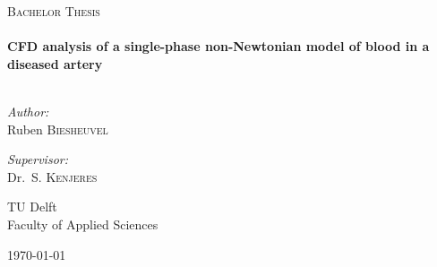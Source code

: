 \begin{titlepage}
\begin{center}



\textsc{\Large Bachelor Thesis}\\[0.5cm]

\HRule \\[0.4cm]
{ \huge \bfseries CFD analysis of a single-phase non-Newtonian model of blood in a diseased artery}\\[0.4cm]

\HRule \\[1.5cm]

\begin{minipage}{0.45\textwidth}
\begin{flushleft} \large
\emph{Author:}\\
Ruben \textsc{Biesheuvel}\\
\end{flushleft}
\end{minipage}
\begin{minipage}{0.45\textwidth}
\begin{flushright} \large
\emph{Supervisor:} \\
Dr.~S. \textsc{Kenjeres}

\end{flushright}
\end{minipage}

\vfill

\begin{minipage}{0.45\textwidth}
\begin{flushleft}
{\large TU Delft}\\
{\normalsize Faculty of Applied Sciences}
\end{flushleft}
\end{minipage}
\begin{minipage}{0.45\textwidth}
\begin{flushright}
{\large \today}
\end{flushright}
\end{minipage}




\end{center}
\end{titlepage}